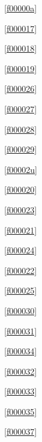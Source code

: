 \noindent\filesourcenumbernameone\ \ref{f00000a}\dotfill\pageref{f00000a}%

\noindent\filesourcenumbernameone\ \ref{f000017}\dotfill\pageref{f000017}%

\noindent\filesourcenumbernameone\ \ref{f000018}\dotfill\pageref{f000018}%

\noindent\filesourcenumbernameone\ \ref{f000019}\dotfill\pageref{f000019}%

\noindent\filesourcenumbernameone\ \ref{f000026}\dotfill\pageref{f000026}%

\noindent\filesourcenumbernameone\ \ref{f000027}\dotfill\pageref{f000027}%

\noindent\filesourcenumbernameone\ \ref{f000028}\dotfill\pageref{f000028}%

\noindent\filesourcenumbernameone\ \ref{f000029}\dotfill\pageref{f000029}%

\noindent\filesourcenumbernameone\ \ref{f00002u}\dotfill\pageref{f00002u}%

\noindent\filesourcenumbernameone\ \ref{f000020}\dotfill\pageref{f000020}%

\noindent\filesourcenumbernameone\ \ref{f000023}\dotfill\pageref{f000023}%

\noindent\filesourcenumbernameone\ \ref{f000021}\dotfill\pageref{f000021}%

\noindent\filesourcenumbernameone\ \ref{f000024}\dotfill\pageref{f000024}%

\noindent\filesourcenumbernameone\ \ref{f000022}\dotfill\pageref{f000022}%

\noindent\filesourcenumbernameone\ \ref{f000025}\dotfill\pageref{f000025}%

\noindent\filesourcenumbernameone\ \ref{f000030}\dotfill\pageref{f000030}%

\noindent\filesourcenumbernameone\ \ref{f000031}\dotfill\pageref{f000031}%

\noindent\filesourcenumbernameone\ \ref{f000034}\dotfill\pageref{f000034}%

\noindent\filesourcenumbernameone\ \ref{f000032}\dotfill\pageref{f000032}%

\noindent\filesourcenumbernameone\ \ref{f000033}\dotfill\pageref{f000033}%

\noindent\filesourcenumbernameone\ \ref{f000035}\dotfill\pageref{f000035}%

\noindent\filesourcenumbernameone\ \ref{f000037}\dotfill\pageref{f000037}%

